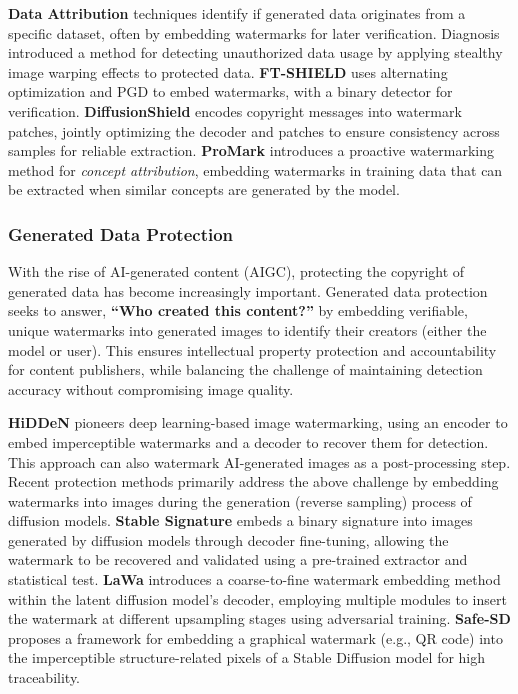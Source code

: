 \textbf{Data Attribution} techniques identify if generated data originates from a specific dataset, often by embedding watermarks for later verification. 
Diagnosis~\cite{wang2023diagnosis} introduced a method for detecting unauthorized data usage by applying stealthy image warping effects to protected data.
\textbf{FT-SHIELD} \cite{cui2023ft} uses alternating optimization and PGD \cite{madry2017towards} to embed watermarks, with a binary detector for verification. \textbf{DiffusionShield} \cite{cui2023diffusionshield} encodes copyright messages into watermark patches, jointly optimizing the decoder and patches to ensure consistency across samples for reliable extraction. \textbf{ProMark} \cite{asnani2024promark} introduces a proactive watermarking method for \emph{concept attribution}, embedding watermarks in training data that can be extracted when similar concepts are generated by the model.

\subsubsection{Generated Data Protection} 
\label{sec:dm_generated_data_proteciton}

With the rise of AI-generated content (AIGC), protecting the copyright of generated data has become increasingly important. Generated data protection seeks to answer, \textbf{“Who created this content?”} by embedding verifiable, unique watermarks into generated images to identify their creators (either the model or user). This ensures intellectual property protection and accountability for content publishers, while balancing the challenge of maintaining detection accuracy without compromising image quality.

\textbf{HiDDeN} \cite{zhu2018hidden} pioneers deep learning-based image watermarking, using an encoder to embed imperceptible watermarks and a decoder to recover them for detection. This approach can also watermark AI-generated images as a post-processing step.
Recent protection methods primarily address the above challenge by embedding watermarks into images during the generation (reverse sampling) process of diffusion models.
\textbf{Stable Signature} \cite{fernandez2023stable} embeds a binary signature into images generated by diffusion models through decoder fine-tuning, allowing the watermark to be recovered and validated using a pre-trained extractor and statistical test.
\textbf{LaWa} \cite{rezaei2024lawa} introduces a coarse-to-fine watermark embedding method within the latent diffusion model's decoder, employing multiple modules to insert the watermark at different upsampling stages using adversarial training. \textbf{Safe-SD} \cite{ma2024safe} proposes a framework for embedding a graphical watermark (e.g., QR code) into the imperceptible structure-related pixels of a Stable Diffusion model for high traceability.

